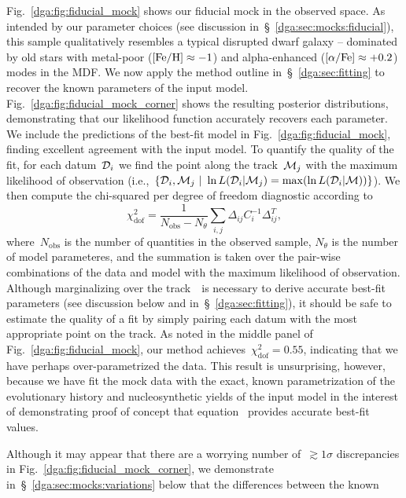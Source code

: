 Fig.~\ref{dga:fig:fiducial_mock} shows our fiducial mock in the observed space.
As intended by our parameter choices (see discussion
in~\S~\ref{dga:sec:mocks:fiducial}), this sample qualitatively resembles a typical
disrupted dwarf galaxy -- dominated by old stars with metal-poor
($\text{[Fe/H]} \approx -1$) and alpha-enhanced ($\text{[$\alpha$/Fe]} \approx +0.2$) modes in the MDF.
We now apply the method outline in~\S~\ref{dga:sec:fitting} to recover the known
parameters of the input model.
Fig.~\ref{dga:fig:fiducial_mock_corner} shows the resulting posterior distributions,
demonstrating that our likelihood function accurately recovers each parameter.
We include the predictions of the best-fit model in Fig.~\ref{dga:fig:fiducial_mock},
finding excellent agreement with the input model.
To quantify the quality of the fit, for each datum~$\mathcal{D}_i$ we find the
point along the track~$\mathcal{M}_j$ with the maximum likelihood of observation
(i.e.,~$\{\mathcal{D}_i,\mathcal{M}_j~|~\ln L(\mathcal{D}_i | \mathcal{M}_j) =
\max(\ln L(\mathcal{D}_i | \mathcal{M}))\}$).
We then compute the chi-squared per degree of freedom diagnostic according to
\begin{equation}
\chi_\text{dof}^2 = \frac{1}{N_\text{obs} - N_\theta}
\sum_{i,j} \Delta_{ij} C_i^{-1} \Delta_{ij}^T,
\label{dga:eq:chisquared_dof}
\end{equation}
where~$N_\text{obs}$ is the number of quantities in the observed sample,
$N_\theta$ is the number of model parameteres, and the summation is taken over
the pair-wise combinations of the data and model with the maximum likelihood of
observation.
Although marginalizing over the track~~is necessary to derive
accurate best-fit parameters (see discussion below and in~\S~\ref{dga:sec:fitting}),
it should be safe to estimate the quality of a fit by simply pairing each datum
with the most appropriate point on the track.
As noted in the middle panel of Fig.~\ref{dga:fig:fiducial_mock}, our method
achieves~$\chi_\text{dof}^2 = 0.55$, indicating that we have perhaps
over-parametrized the data.
This result is unsurprising, however, because we have fit the mock data with
the exact, known parametrization of the evolutionary history and
nucleosynthetic yields of the input model in the interest of demonstrating
proof of concept that equation~ provides accurate best-fit
values.
\par
Although it may appear that there are a worrying number of~$\gtrsim 1\sigma$
discrepancies in Fig.~\ref{dga:fig:fiducial_mock_corner}, we demonstrate
in~\S~\ref{dga:sec:mocks:variations} below that the differences between the known
